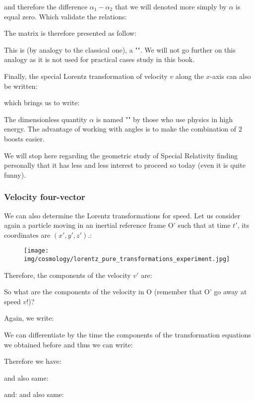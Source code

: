 	and therefore the difference $\alpha_1-\alpha_2$ that we will denoted more simply by $\alpha$ is equal zero. Which validate the relations:
	
	The matrix is therefore presented as follow:
	
	This is (by analogy to the classical one), a "\label{hyperbolic rotation matrix}". We will not go further on this analogy as it is not used for practical cases study in this book.
	
	Finally, the special Lorentz transformation of velocity $v$ along the $x$-axis can also be written:
	
	which brings us to write:
	
	The dimensionless quantity $\alpha$ is named "" by those who use physics in high energy. The advantage of working with angles is to make the combination of $2$ boosts easier.

	We will stop here regarding the geometric study of Special Relativity finding personally that it has less and less interest to proceed so today (even it is quite funny).
	
	\subsubsection{Velocity four-vector}\label{four vector velocity}
	We can also determine the Lorentz transformations for speed. Let us consider again a particle moving in an inertial reference frame O' such that at time $t'$, its coordinates are $(x ', y', z ').$:
	\begin{figure}[H]
		\begin{center}
		\texttt{[image: img/cosmology/lorentz\_pure\_transformations\_experiment.jpg]}
		\end{center}	
	\end{figure}
	Therefore, the components of the velocity $v'$ are:
	
	So what are the components of the velocity in O (remember that O' go away at speed $v$!)?
	
	Again, we write:
	
	We can differentiate by the time the components of the transformation equations we obtained before and thus we can write:
	
	Therefore we have:
	
	and also same:
	
	and:
	and also same:
	

